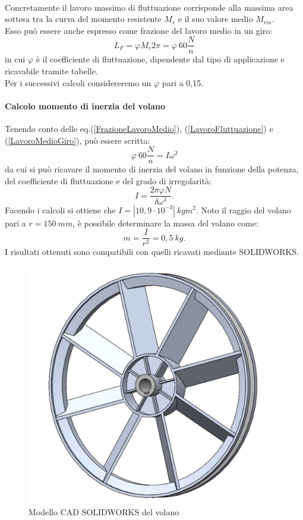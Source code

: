 \\
Concretamente il lavoro massimo di fluttuazione corrisponde alla massima area sottesa tra la curva del momento resistente $M_r$ e il suo valore medio $M_{rm}$.\\
Esso può essere anche espresso come frazione del lavoro medio in un giro: 
\begin{equation}
    L_F=\varphi M_r2\pi=\varphi\ 60\frac{N}{n}
    \label{FrazioneLavoroMedio}
\end{equation}
in cui $\varphi$ è il coefficiente di fluttuazione, dipendente dal tipo di applicazione e ricavabile tramite tabelle. \\
Per i successivi calcoli considereremo un $\varphi$ pari a 0,15. 
\paragraph{Calcolo momento di inerzia del volano}Tenendo conto delle eq.(\ref{FrazioneLavoroMedio}), (\ref{LavoroFluttuazione}) e (\ref{LavoroMedioGiro}), può essere scritta:
\begin{equation}
    \varphi\ 60\frac{N}{n}=I\omega^2
\end{equation}
da cui si può ricavare il momento di inerzia del volano in funzione della potenza, del coefficiente di fluttuazione e del grado di irregolarità:
\begin{equation}
    I=\frac{2\pi\varphi N}{\delta \omega^3}.
\end{equation}
Facendo i calcoli si ottiene che $I=\left|10,9\cdot10^{-3}\right|\ kgm^2$. 
Noto il raggio del volano pari a $r=150\ mm$, è possibile determinare la massa del volano come: 
\begin{equation}
    m=\frac{I}{r^2}=0,5\ kg.
\end{equation}
I risultati ottenuti sono compatibili con quelli ricavati mediante SOLIDWORKS.
\begin{figure}[h]
    \centering
    \includegraphics[scale=0.2]{Immagini/Volano.png}
    \caption{Modello CAD SOLIDWORKS del volano}
    \label{fig:Volano}
\end{figure}
